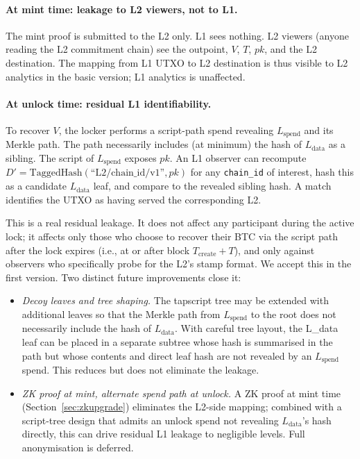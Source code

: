 \documentclass[11pt,a4paper]{article}
\begin{document}
\paragraph{At mint time: leakage to L2 viewers, not to L1.} The mint proof is submitted to the L2 only. L1 sees nothing. L2 viewers (anyone reading the L2 commitment chain) see the outpoint, $V$, $T$, $pk$, and the L2 destination. The mapping from L1 UTXO to L2 destination is thus visible to L2 analytics in the basic version; L1 analytics is unaffected.

\paragraph{At unlock time: residual L1 identifiability.} To recover $V$, the locker performs a script-path spend revealing $L_{\mathrm{spend}}$ and its Merkle path. The path necessarily includes (at minimum) the hash of $L_{\mathrm{data}}$ as a sibling. The script of $L_{\mathrm{spend}}$ exposes $pk$. An L1 observer can recompute $D' = \mathrm{TaggedHash}(\text{``L2/chain\_id/v1''}, pk)$ for any \texttt{chain\_id} of interest, hash this as a candidate $L_{\mathrm{data}}$ leaf, and compare to the revealed sibling hash. A match identifies the UTXO as having served the corresponding L2.

This is a real residual leakage. It does not affect any participant during the active lock; it affects only those who choose to recover their BTC via the script path after the lock expires (i.e., at or after block $T_{\mathrm{create}} + T$), and only against observers who specifically probe for the L2's stamp format. We accept this in the first version. Two distinct future improvements close it:

\begin{itemize}[leftmargin=*]
  \item \emph{Decoy leaves and tree shaping.} The tapscript tree may be extended with additional leaves so that the Merkle path from $L_{\mathrm{spend}}$ to the root does not necessarily include the hash of $L_{\mathrm{data}}$. With careful tree layout, the L\_data leaf can be placed in a separate subtree whose hash is summarised in the path but whose contents and direct leaf hash are not revealed by an $L_{\mathrm{spend}}$ spend. This reduces but does not eliminate the leakage.
  \item \emph{ZK proof at mint, alternate spend path at unlock.} A ZK proof at mint time (Section~\ref{sec:zkupgrade}) eliminates the L2-side mapping; combined with a script-tree design that admits an unlock spend not revealing $L_{\mathrm{data}}$'s hash directly, this can drive residual L1 leakage to negligible levels. Full anonymisation is deferred.
\end{itemize}
\end{document}
